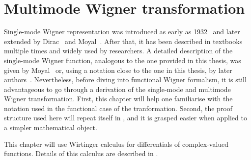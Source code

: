 \chapter{Multimode Wigner transformation}
\label{cha:mm-wigner}

Single-mode Wigner representation was introduced as early as 1932~\cite{Wigner1932} and later extended by Dirac~\cite{Dirac1945} and Moyal~\cite{Moyal1947}.
After that, it has been described in textbooks multiple times and widely used by researchers.
A detailed description of the single-mode Wigner function, analogous to the one provided in this thesis, was given by Moyal~\cite{Moyal1947} or, using a notation close to the one in this thesis, by later authors~\cite{Cahill1969,Hillery1984,Gardiner2004}.
Nevertheless, before diving into functional Wigner formalism, it is still advantageous to go through a derivation of the single-mode and multimode Wigner transformation.
First, this chapter will help one familiarise with the notation used in the functional case of the tranformation.
Second, the proof structure used here will repeat itself in , and it is grasped easier when applied to a simpler mathematical object.

This chapter will use Wirtinger calculus for differentials of complex-valued functions.
Details of this calculus are described in .




